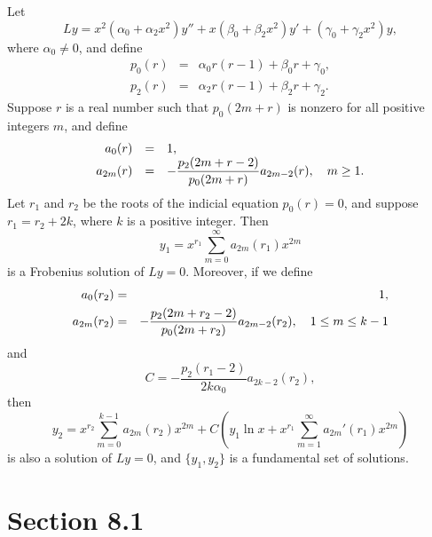 \setcounter{theorem}{1}
\setcounter{equation}{21}
\begin{theorem}
  \label{thmtype:7.7.2} Let
  \[
    Ly= x^{2}(\alpha_{0}+\alpha_{2}x^{2})y''+x(\beta_{0}+\beta_{2}x^{2})y' +(\gamma_{0}+\gamma_{2}x^{2})y,
  \]
  where $\alpha_{0}\ne0$, and define
  \begin{eqnarray*}
    p_{0}(r) & = & \alpha_{0}r(r-1)+\beta_{0}r+\gamma_{0}, \\[5pt]
    p_{2}(r) & = & \alpha_{2}r(r-1)+\beta_{2}r+\gamma_{2}.
  \end{eqnarray*}
  Suppose $r$ is a real number such that $p_{0}(2m+r)$ is nonzero for all positive integers $m$, and
  define
  \begin{equation}
    \label{eq:7.7.22}
    \begin{array}{rcl}
      a_{0}(r)  & = & 1,                                                             \\
      a_{2m}(r) & = & -\displaystyle\frac{p_{2}(2m+r-2)}{p_{0}(2m+r)}a_{2m-2}(r),\quad m\ge1.
    \end{array}
  \end{equation}
  Let $r_{1}$ and $r_{2}$ be the roots of the indicial equation $p_{0}(r)=0$, and suppose
  $r_{1}=r_{2}+2k$, where $k$ is a positive integer. Then
  \[
    y_{1}=x^{r_{1}}\sum_{m=0}^{\infty}a_{2m}(r_{1})x^{2m}
  \]
  is a Frobenius solution of $Ly=0$. Moreover, if we define
  \begin{eqnarray*}
    a_{0}(r_{2})  & = & 1, \\
    a_{2m}(r_{2}) & = & -\displaystyle\frac{p_{2}(2m+r_{2}-2)}{p_{0}(2m+r_{2})}a_{2m-2}(r_{2}),\quad1\le m\le k-1
  \end{eqnarray*}
  and
  \begin{equation}
    \label{eq:7.7.23}C=-\frac{p_{2}(r_{1}-2)}{2k\alpha_{0}}a_{2k-2}(r_{2}),
  \end{equation}
  then
  \begin{equation}
    \label{eq:7.7.24}y_{2}=x^{r_{2}}\sum_{m=0}^{k-1}a_{2m}(r_{2})x^{2m}+C\left(y_{1}\ln x+x^{r_{1}}\sum_{m=1}^{\infty}a_{2m}'(r_{1})x^{2m}\right)
  \end{equation}
  is also a solution of $Ly=0$, and $\{y_{1},y_{2}\}$ is a fundamental set of solutions.
\end{theorem}

\section*{Section 8.1}
{}
\setcounter{chapter}{8}
\setcounter{section}{1}

